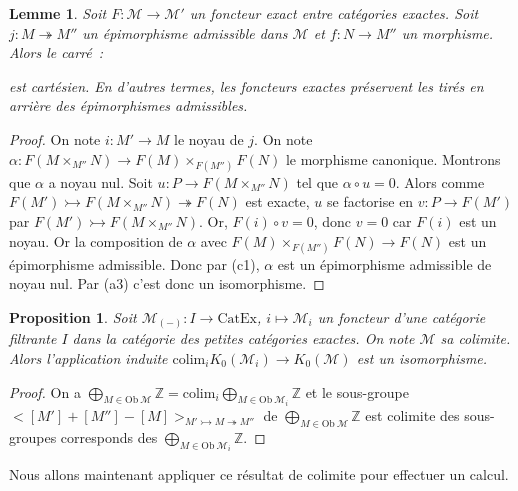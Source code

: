 \documentclass{amsart}
\theoremstyle{plain}
\newtheorem{prop}[theo]{Proposition}
\newtheorem{lem}[theo]{Lemme}
\theoremstyle{definition}
\theoremstyle{remark}
\newcommand{\ensemblenombre }[1]{\mathbb{#1}}
\newcommand{\Z}{\ensemblenombre{Z}}
\newcommand{\M}{\mathcal{M}}
\newcommand{\Ob}[1]{\mathrm{Ob}\:#1}
\newcommand{\CatEx}{\mathrm{CatEx}}
\newcommand{\colim}{\mathrm{colim}}
\newcommand{\ra}{\rightarrow}
\newcommand{\exac}[3]{{#1}\rightarrowtail {#2}\twoheadrightarrow {#3}}
\begin{document}
\begin{lem}\label{tireEnArriereExact}
  Soit $F:\M\ra\M'$ un foncteur exact entre catégories exactes. Soit $j:M\twoheadrightarrow M''$ un épimorphisme admissible dans $\M$ et $f:N\ra M''$
  un morphisme. Alors le carré~:
  \begin{center}
  \end{center}
  est cartésien. En d'autres termes, les foncteurs exactes préservent les tirés en arrière des épimorphismes admissibles.
\end{lem}

\begin{proof}
  On note $i:M'\ra M$ le noyau de $j$.
  On note $\alpha: F(M\times_{M''}N)\ra F(M)\times_{F(M'')}F(N)$ le morphisme canonique. Montrons que $\alpha$ a noyau nul.
  Soit $u:P\ra F(M\times_{M''}N)$ tel que $\alpha\circ u=0$. Alors comme $\exac{F(M')}{F(M\times_{M''}N)}{F(N)}$ est exacte,
  $u$ se factorise en $v: P\ra F(M')$ par $F(M')\rightarrowtail F(M\times_{M''}N)$. Or, $F(i)\circ v=0$, donc $v=0$ car
  $F(i)$ est un noyau.
  Or la composition de $\alpha$ avec $F(M)\times_{F(M'')}F(N)\ra F(N)$ est un épimorphisme admissible. Donc par (c1), 
  $\alpha$ est un épimorphisme admissible de noyau nul. Par (a3) c'est donc un isomorphisme.
\end{proof}

\begin{prop}\label{CatExColimitesK0}
  Soit $\M_{(-)}:I\ra \CatEx$, $i\mapsto \M_i$ un foncteur d'une catégorie filtrante $I$ dans la catégorie des petites catégories exactes.
  On note $\M$ sa colimite. Alors l'application induite $\colim_i K_0(\M_i)\ra K_0(\M)$ est un isomorphisme.
\end{prop}

\begin{proof}
  On a $\bigoplus_{M\in\Ob{\M}} \Z = \colim_i \bigoplus_{M\in\Ob{\M_i}}\Z$ et le sous-groupe $<[M']+[M'']-[M]>_{\exac{M'}{M}{M''}}$
  de $\bigoplus_{M\in\Ob{\M}}\Z$ est colimite des sous-groupes corresponds des $\bigoplus_{M\in\Ob{\M_i}}\Z$.
\end{proof}

Nous allons maintenant appliquer ce résultat de colimite pour effectuer un calcul.
\end{document}
